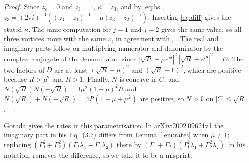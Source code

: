 \documentclass[11pt]{article}
\theoremstyle{definition}
\begin{document}
\begin{proof}
Since $z_c = 0$ and $z_3 = 1$, $\kappa = \dot z_3$, and by \eqref{eq:bs}, $\overline{\dot z_3} = (2\pi i)^{-1} ((z_3 - z_1)^{-1} + \mu (z_3 - z_2)^{-1})$. Inserting \eqref{eq:diff} gives the stated $\kappa$. The same computation for $j = 1$ and $j = 2$ gives the same value, so all three vortices move with the same $\kappa$, in agreement with \cite{kimura1987}, \cite[Sect.~3.1]{ks2018}. The real and imaginary parts follow on multiplying numerator and denominator by the complex conjugate of the denominator, since $|\sqrt{R} - \mu e^{i\theta}|^2 \, |\sqrt{R} + e^{i\theta}|^2 = D$. The two factors of $D$ are at least $(\sqrt{R} - \mu)^2$ and $(\sqrt{R} - 1)^2$, which are positive because $R > \mu^2$ and $R > 1$. Finally, $N$ is concave in $C$, and $N(\sqrt{R}) N(-\sqrt{R}) = 3\mu^2 (1 + \mu)^2 R$ and $N(\sqrt{R}) + N(-\sqrt{R}) = 4R(1 - \mu + \mu^2)$ are positive, so $N > 0$ on $|C| \le \sqrt{R}$.
\end{proof}

Gotoda \cite[Sect.~3]{gotoda2021} gives the rates in this parametrization. In arXiv:2002.09624v1 the imaginary part in his Eq.~(3.3) differs from Lemma~\ref{lem:rates} when $\mu \neq 1$; replacing $(\Gamma_1^2 + \Gamma_2^2)(\Gamma_2\lambda_1 + \Gamma_1\lambda_2)$ there by $(\Gamma_1 + \Gamma_2)(\Gamma_1^2\lambda_1 + \Gamma_2^2\lambda_2)$, in his notation, removes the difference, so we take it to be a misprint.
\end{document}
